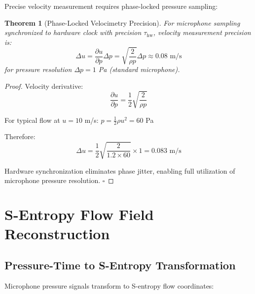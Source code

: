 \documentclass[12pt,a4paper]{article}
\newtheorem{theorem}{Theorem}
\begin{document}
Precise velocity measurement requires phase-locked pressure sampling:

\begin{theorem}[Phase-Locked Velocimetry Precision]
For microphone sampling synchronized to hardware clock with precision $\tau_{\text{hw}}$, velocity measurement precision is:
\begin{equation}
\Delta u = \frac{\partial u}{\partial p} \Delta p = \sqrt{\frac{2}{\rho p}} \Delta p \approx 0.08 \text{ m/s}
\end{equation}
for pressure resolution $\Delta p = 1$ Pa (standard microphone).
\end{theorem}

\begin{proof}
Velocity derivative:
\begin{equation}
\frac{\partial u}{\partial p} = \frac{1}{2}\sqrt{\frac{2}{\rho p}}
\end{equation}

For typical flow at $u = 10$ m/s: $p = \frac{1}{2}\rho u^2 = 60$ Pa

Therefore:
\begin{equation}
\Delta u = \frac{1}{2}\sqrt{\frac{2}{1.2 \times 60}} \times 1 = 0.083 \text{ m/s}
\end{equation}

Hardware synchronization eliminates phase jitter, enabling full utilization of microphone pressure resolution. $\square$
\end{proof}

\section{S-Entropy Flow Field Reconstruction}

\subsection{Pressure-Time to S-Entropy Transformation}

Microphone pressure signals transform to S-entropy flow coordinates:
\end{document}
